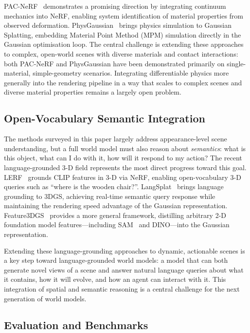 PAC-NeRF~\citep{li2023pac} demonstrates a promising direction by integrating
continuum mechanics into NeRF, enabling system identification of material
properties from observed deformation.
PhysGaussian~\citep{xie2024physgaussian} brings physics simulation to Gaussian
Splatting, embedding Material Point Method (MPM) simulation directly in the
Gaussian optimisation loop.
The central challenge is extending these approaches to complex, open-world
scenes with diverse materials and contact interactions: both PAC-NeRF and
PhysGaussian have been demonstrated primarily on single-material, simple-geometry
scenarios.
Integrating differentiable physics more generally into the rendering pipeline
in a way that scales to complex scenes and diverse material properties remains
a largely open problem.

\subsection{Open-Vocabulary Semantic Integration}

The methods surveyed in this paper largely address appearance-level scene
understanding, but a full world model must also reason about \emph{semantics}:
what is this object, what can I do with it, how will it respond to my action?
The recent language-grounded 3-D field represents the most direct progress
toward this goal.
LERF~\citep{kerr2023lerf} grounds CLIP features in 3-D via NeRF,
enabling open-vocabulary 3-D queries such as ``where is the wooden chair?''.
LangSplat~\citep{qin2024langsplat} brings language grounding to 3DGS,
achieving real-time semantic query response while maintaining the rendering
speed advantage of the Gaussian representation.
Feature3DGS~\citep{zhou2024feature3dgs} provides a more general framework,
distilling arbitrary 2-D foundation model features---including SAM~\citep{kirillov2023sam}
and DINO---into the Gaussian representation.

Extending these language-grounding approaches to dynamic, actionable scenes
is a key step toward language-grounded world models: a model that can both
generate novel views of a scene and answer natural language queries about
what it contains, how it will evolve, and how an agent can interact with it.
This integration of spatial and semantic reasoning is a central challenge for
the next generation of world models.

\subsection{Evaluation and Benchmarks}

